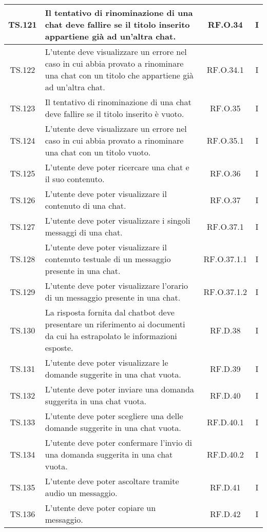 {{{{{{{{{\begin{xltabular}{\textwidth}{|c|X|c|c|}
    \hline
    TS.121 & Il tentativo di rinominazione di una chat deve fallire se il titolo inserito appartiene già ad un’altra chat. & RF.O.34 & I \\
    \hline
    TS.122 & L’utente deve visualizzare un errore nel caso in cui abbia provato a rinominare una chat con un titolo che appartiene già ad un’altra chat. & RF.O.34.1 & I \\
    \hline
    TS.123 & Il tentativo di rinominazione di una chat deve fallire se il titolo inserito è vuoto. & RF.O.35 & I \\
    \hline
    TS.124 & L’utente deve visualizzare un errore nel caso in cui abbia provato a rinominare una chat con un titolo vuoto. & RF.O.35.1 & I \\
    \hline
    TS.125 & L’utente deve poter ricercare una chat e il suo contenuto. & RF.O.36 & I \\
    \hline
    TS.126 & L’utente deve poter visualizzare il contenuto di una chat. & RF.O.37 & I \\
    \hline
    TS.127 & L’utente deve poter visualizzare i singoli messaggi di una chat. & RF.O.37.1 & I \\
    \hline
    TS.128 & L’utente deve poter visualizzare il contenuto testuale di un messaggio presente in una chat. & RF.O.37.1.1 & I \\
    \hline
    TS.129 & L’utente deve poter visualizzare l’orario di un messaggio presente in una chat. & RF.O.37.1.2 & I \\
    \hline
    TS.130 & La risposta fornita dal chatbot deve presentare un riferimento ai documenti da cui ha estrapolato le informazioni esposte. & RF.D.38 & I \\
    \hline
    TS.131 & L’utente deve poter visualizzare le domande suggerite in una chat vuota. & RF.D.39 & I \\
    \hline
    TS.132 & L’utente deve poter inviare una domanda suggerita in una chat vuota. & RF.D.40 & I \\
    \hline
    TS.133 & L’utente deve poter scegliere una delle domande suggerite in una chat vuota. & RF.D.40.1 & I \\
    \hline
    TS.134 & L’utente deve poter confermare l’invio di una domanda suggerita in una chat vuota. & RF.D.40.2 & I \\
    \hline
    TS.135 & L’utente deve poter ascoltare tramite audio un messaggio. & RF.D.41 & I \\
    \hline
    TS.136 & L’utente deve poter copiare un messaggio. & RF.D.42 & I \\

\end{xltabular}}}}}}}}}}
